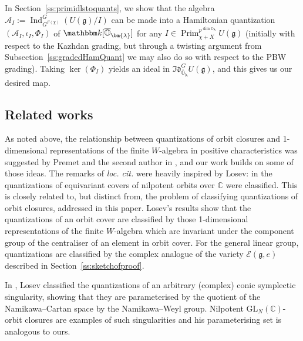 \documentclass[twoside,12pt,reqno]{amsart}
\theoremstyle{remark}
\numberwithin{equation}{section}
\def\k{{\mathbbm k}}
\def\Ind{\operatorname{Ind}}
\def\Prim{\operatorname{Prim}}
\def\blambda{{\bm{\lambda}}}
\def\o{\overline}
\def\C{{\mathbb C}}
\def\O{{\mathbb O}}
\def\cO{{\overline{\mathbb O}}}
\def\GL{\mathrm{GL}}
\def\g{{\mathfrak g}}
\def\Idl{\mathfrak{Id}}
\def\cA{\mathcal{A}}
\def\E{\mathcal{E}}
\begin{document}
In Section~\ref{ss:primidlstoquants}, we show that the algebra $\cA_I:=\Ind_{G^{F(\chi)}}^G (U(\g)/I)$ can be made into a Hamiltonian quantization $(\cA_I,\iota_I,\Phi_I)$ of $\k[\cO_\blambda]$ for any $I\in \Prim_{\chi+X}^{p^{\dim \O_\blambda}}U(\g)$ (initially with respect to the Kazhdan grading, but through a twisting argument from Subsection~\ref{ss:gradedHamQuant} we may also do so with respect to the PBW grading). Taking $\ker(\Phi_I)$ yields an ideal in $\Idl_{\o\O_\blambda}^G U(\g)$, and this gives us our desired map.



\subsection{Related works}

As noted above, the relationship between quantizations of orbit closures and 1-dimensional representations of the finite $W$-algebra in positive characteristics was suggested by Premet and the second author in \cite[Remark~5.8]{PT20}, and our work builds on some of those ideas. The remarks of {\it loc. cit.} were heavily inspired by Losev: in \cite{LoQNO} the quantizations of equivariant covers of nilpotent orbits over $\C$ were classified. This is closely related to, but distinct from, the problem of classifying quantizations of orbit closures, addressed in this paper. Losev's results show that the quantizations of an orbit cover are classified by those 1-dimensional representations of the finite $W$-algebra which are invariant under the component group of the centraliser of an element in orbit cover. For the general linear group, quantizations are classified by the complex analogue of the variety $\E(\g,e)$ described in Section~\ref{ss:sketchofproof}.

In \cite{LoOM}, Losev classified the quantizations of an arbitrary (complex) conic symplectic singularity, showing that they are parameterised by the quotient of the Namikawa--Cartan space by the Namikawa--Weyl group. Nilpotent $\GL_N(\C)$-orbit closures are examples of such singularities and his parameterising set is analogous to ours.
\end{document}
